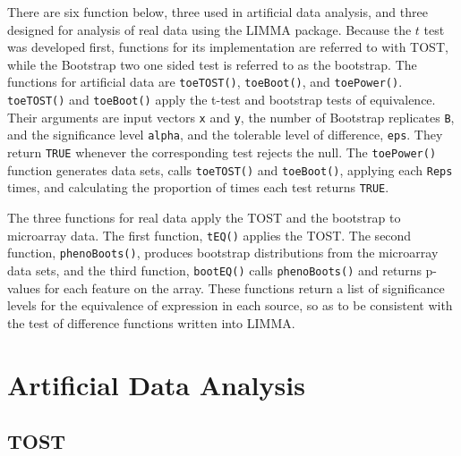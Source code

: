 There are six function below, three used in artificial data analysis, and three designed for analysis of real data using the LIMMA package.  Because the $t$ test was developed first, functions for its implementation are referred to with TOST, while the Bootstrap two one sided test is referred to as the bootstrap. The functions for artificial data are \texttt{toeTOST()}, \texttt{toeBoot()}, and \texttt{toePower()}.  \texttt{toeTOST()} and \texttt{toeBoot()} apply the t-test and bootstrap tests of equivalence. Their arguments are input vectors \texttt{x} and \texttt{y}, the number of Bootstrap replicates \texttt{B}, and  the significance level \texttt{alpha}, and the tolerable level of difference, \texttt{eps}. They return \texttt{TRUE} whenever the corresponding test rejects the null. The \texttt{toePower()} function generates data sets, calls \texttt{toeTOST()} and \texttt{toeBoot()}, applying each \texttt{Reps} times, and calculating the proportion of times each test returns \texttt{TRUE}.

The three functions for real data apply the TOST and the bootstrap to microarray data. The first function, \texttt{tEQ()} applies the TOST. The second function, \texttt{phenoBoots()}, produces bootstrap distributions from the microarray data sets, and the third function, \texttt{bootEQ()} calls \texttt{phenoBoots()} and returns p-values for each feature on the array. These functions return a list of significance levels for the equivalence of expression in each source, so as to be consistent with the test of difference functions written into LIMMA. 


\section{Artificial Data Analysis}
\subsection{TOST}
